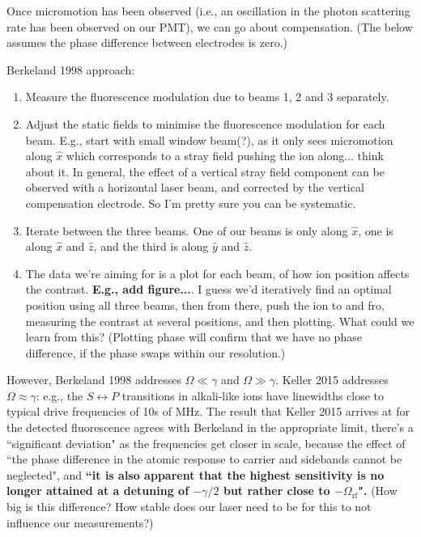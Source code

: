 \documentclass{article}
\begin{document}
Once micromotion has been observed (i.e., an oscillation in the photon scattering rate has been observed on our PMT), we can go about compensation. (The below assumes the phase difference between electrodes is zero.)

Berkeland 1998 approach:

\begin{enumerate}
\item Measure the fluorescence modulation due to beams 1, 2 and 3 separately.
\item Adjust the static fields to minimise the fluorescence modulation for each beam. E.g., start with small window beam(?), as it only sees micromotion along $\hat{x}$ which corresponds to a stray field pushing the ion along... think about it. In general, the effect of a vertical stray field component can be observed with a horizontal laser beam, and corrected by the vertical compensation electrode. So I'm pretty sure you can be systematic.
\item Iterate between the three beams. One of our beams is only along $\hat{x}$, one is along $\hat{x}$ and $\hat{z}$, and the third is along $\hat{y}$ and $\hat{z}$. 
\item The data we're aiming for is a plot for each beam, of how ion position affects the contrast. \textbf{E.g., add figure...}. I guess we'd iteratively find an optimal position using all three beams, then from there, push the ion to and fro, measuring the contrast at several positions, and then plotting. What could we learn from this? (Plotting phase will confirm that we have no phase difference, if the phase swaps within our resolution.)
\end{enumerate}

However, Berkeland 1998  addresses $\Omega \ll \gamma$ and $\Omega \gg \gamma$. Keller 2015 addresses $\Omega \approx \gamma$: e.g., the $S \leftrightarrow P$ transitions in alkali-like ions have linewidths close to typical drive frequencies of 10s of MHz. The result that Keller 2015 arrives at for the detected fluorescence agrees with Berkeland in the appropriate limit, there's a ``significant deviation" as the frequencies get closer in scale, because the effect of ``the phase difference in the atomic response to carrier and sidebands cannot be neglected", and \textbf{``it is also apparent that the highest sensitivity is no longer attained at a detuning of $-\gamma/2$ but rather close to $-\Omega_{\mathrm{rf}}$".} (How big is this difference? How stable does our laser need to be for this to not influence our measurements?)
\end{document}
